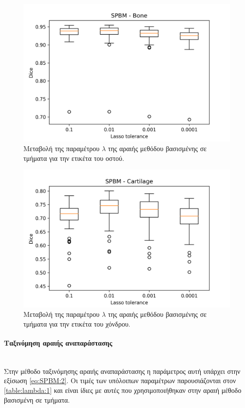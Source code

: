 \documentclass[a4paper,12pt]{article}
\newcommand{\paragraphLine}[1]{\paragraph{#1}\mbox{}\\}
\begin{document}
\begin{figure}[H]
    \centering
    \includegraphics[width=0.85\linewidth]{SPBM_Lasso_tolerance_Bone_plot.png}
    \caption{Μεταβολή της παραμέτρου $\lambda$ της αραιής μεθόδου βασισμένης σε
             τμήματα για την ετικέτα του οστού.}
    \label{fig:SPBM:lambda:2}
\end{figure}

\begin{figure}[H]
    \centering
    \includegraphics[width=0.85\linewidth]{SPBM_Lasso_tolerance_Cartilage_plot.png}
    \caption{Μεταβολή της παραμέτρου $\lambda$ της αραιής μεθόδου βασισμένης σε
             τμήματα για την ετικέτα του χόνδρου.}
    \label{fig:SPBM:lambda:3}
\end{figure}

\paragraphLine{Ταξινόμηση αραιής αναπαράστασης}

Στην μέθοδο ταξινόμησης αραιής αναπαράστασης η παράμετρος αυτή υπάρχει στην
εξίσωση \eqref{eq:SPBM:2}. Οι τιμές των υπόλοιπων παραμέτρων παρουσιάζονται στον
\autoref{table:lambda:1} και είναι ίδιες με αυτές που χρησιμοποιήθηκαν στην
αραιή μέθοδο βασισμένη σε τμήματα.
\end{document}
